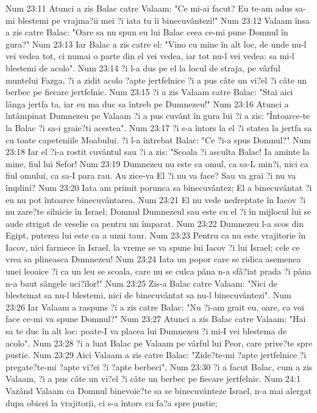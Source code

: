 Num 23:11  Atunci a zis Balac catre Valaam: "Ce mi-ai facut? Eu te-am adus sa-mi blestemi pe vrajma?ii mei ?i iata tu îi binecuvântezi!"
Num 23:12  Valaam însa a zis catre Balac: "Oare sa nu spun eu lui Balac ceea ce-mi pune Domnul în gura?"
Num 23:13  Iar Balac a zis catre el: "Vino cu mine în alt loc, de unde nu-l vei vedea tot, ci numai o parte din el vei vedea, iar tot nu-l vei vedea: sa mi-l blestemi de acolo".
Num 23:14  ?i l-a dus pe el la locul de straja, pe vârful muntelui Fazga, ?i a zidit acolo ?apte jertfelnice ?i a pus câte un vi?el ?i câte un berbec pe fiecare jertfelnic.
Num 23:15  ?i a zis Valaam catre Balac: "Stai aici lânga jertfa ta, iar eu ma duc sa întreb pe Dumnezeu!"
Num 23:16  Atunci a întâmpinat Dumnezeu pe Valaam ?i a pus cuvânt în gura lui ?i a zis: "Întoarce-te la Balac ?i sa-i graie?ti acestea".
Num 23:17  ?i s-a întors la el ?i statea la jertfa sa cu toate capeteniile Moabului. ?i l-a întrebat Balac: "Ce ?i-a spus Domnul?"
Num 23:18  Iar el ?i-a rostit cuvântul sau ?i a zis: "Scoala ?i asculta Balac! Ia aminte la mine, fiul lui Sefor!
Num 23:19  Dumnezeu nu este ca omul, ca sa-L min?i, nici ca fiul omului, ca sa-I para rau. Au zice-va El ?i nu va face? Sau va grai ?i nu va împlini?
Num 23:20  Iata am primit porunca sa binecuvântez; El a binecuvântat ?i eu nu pot întoarce binecuvântarea.
Num 23:21  El nu vede nedreptate în Iacov ?i nu zare?te silnicie în Israel; Domnul Dumnezeul sau este cu el ?i în mijlocul lui se aude strigat de veselie ca pentru un împarat.
Num 23:22  Dumnezeu l-a scos din Egipt, puterea lui este ca a unui taur.
Num 23:23  Pentru ca nu este vrajitorie în Iacov, nici farmece în Israel, la vreme se va spune lui Iacov ?i lui Israel; cele ce vrea sa plineasca Dumnezeu!
Num 23:24  Iata un popor care se ridica asemenea unei leoaice ?i ca un leu se scoala, care nu se culca pâna n-a sfâ?iat prada ?i pâna n-a baut sângele uci?ilor!"
Num 23:25  Zis-a Balac catre Valaam: "Nici de blestemat sa nu-l blestemi, nici de binecuvântat sa nu-l binecuvântezi".
Num 23:26  Iar Valaam a raspuns ?i a zis catre Balac: "Nu ?i-am grait eu, oare, ca voi face ce-mi va spune Domnul?"
Num 23:27  Atunci a zis Balac catre Valaam: "Hai sa te duc în alt loc: poate-I va placea lui Dumnezeu ?i mi-I vei blestema de acolo".
Num 23:28  ?i a luat Balac pe Valaam pe vârful lui Peor, care prive?te spre pustie.
Num 23:29  Aici Valaam a zis catre Balac: "Zide?te-mi ?apte jertfelnice ?i pregate?te-mi ?apte vi?ei ?i ?apte berbeci",
Num 23:30  ?i a facut Balac, cum a zis Valaam, ?i a pus câte un vi?el ?i câte un berbec pe fiecare jertfelnic.
Num 24:1  Vazând Valaam ca Domnul binevoie?te sa se binecuvânteze Israel, n-a mai alergat dupa obicei la vrajitorii, ci s-a întors cu fa?a spre pustie;
